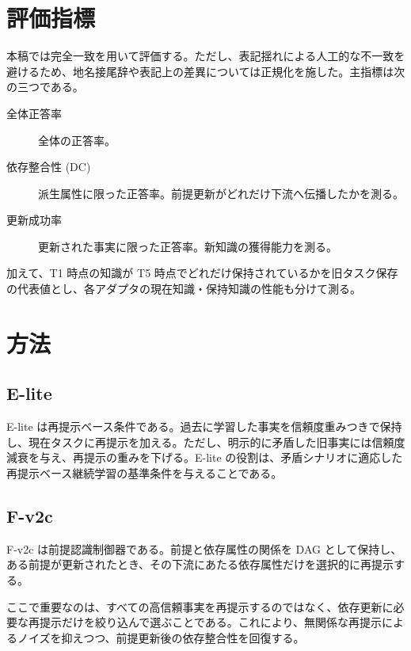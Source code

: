 \documentclass[12pt,a4paper]{article}
\begin{document}
\section{評価指標}

本稿では完全一致を用いて評価する。ただし、表記揺れによる人工的な不一致を避けるため、地名接尾辞や表記上の差異については正規化を施した。主指標は次の三つである。

\begin{description}
  \item[全体正答率] 全体の正答率。
  \item[依存整合性 (DC)] 派生属性に限った正答率。前提更新がどれだけ下流へ伝播したかを測る。
  \item[更新成功率] 更新された事実に限った正答率。新知識の獲得能力を測る。
\end{description}

加えて、T1 時点の知識が T5 時点でどれだけ保持されているかを旧タスク保存の代表値とし、各アダプタの現在知識・保持知識の性能も分けて測る。

\section{方法}

\subsection{E-lite}

E-lite は再提示ベース条件である。過去に学習した事実を信頼度重みつきで保持し、現在タスクに再提示を加える。ただし、明示的に矛盾した旧事実には信頼度減衰を与え、再提示の重みを下げる。E-lite の役割は、矛盾シナリオに適応した再提示ベース継続学習の基準条件を与えることである。

\subsection{F-v2c}

F-v2c は前提認識制御器である。前提と依存属性の関係を DAG として保持し、ある前提が更新されたとき、その下流にあたる依存属性だけを選択的に再提示する。

ここで重要なのは、すべての高信頼事実を再提示するのではなく、依存更新に必要な再提示だけを絞り込んで選ぶことである。これにより、無関係な再提示によるノイズを抑えつつ、前提更新後の依存整合性を回復する。
\end{document}
